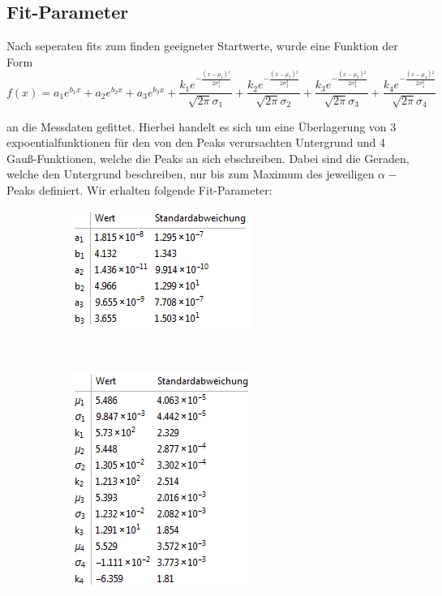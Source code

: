 \documentclass[bigchapter,colorback,accentcolor=tud4b,linedtoc,11pt]{tudreport}
\begin{document}
\subsection{Fit-Parameter}
Nach seperaten fits zum finden geeigneter Startwerte, wurde eine Funktion der
Form
$$f(x)=a_1 e^{b_1 x}+a_2 e^{b_2 x}+a_3 e^{b_3 x}+\frac{k_1 e^{-\frac{\left(x-\mu _1\right){}^2}{2 \sigma _1^2}}}{\sqrt{2 \pi } \sigma _1}+\frac{k_2 e^{-\frac{\left(x-\mu _2\right){}^2}{2 \sigma _2^2}}}{\sqrt{2 \pi } \sigma _2}+\frac{k_3 e^{-\frac{\left(x-\mu _3\right){}^2}{2 \sigma _3^2}}}{\sqrt{2 \pi } \sigma _3}+\frac{k_4 e^{-\frac{\left(x-\mu _4\right){}^2}{2 \sigma _4^2}}}{\sqrt{2 \pi } \sigma _4}$$

an die Messdaten gefittet. Hierbei handelt es sich um eine Überlagerung von 3
expoentialfunktionen für den von den Peaks verursachten Untergrund und 4
Gauß-Funktionen, welche die Peaks an sich ebschreiben. Dabei sind die Geraden, welche den Untergrund
beschreiben, nur bis zum Maximum des jeweiligen $\alpha-$ Peaks definiert.
Wir erhalten folgende Fit-Parameter:
\begin{figure}[H]
    \centering
    \begin{subfigure}[H]{0.44\textwidth}
        \includegraphics[scale=1]{img/alpha-exp-fits-parameter.png}
    \end{subfigure}%
    \qquad
    ~%
    \begin{subfigure}[H]{0.44\textwidth}
        \includegraphics[scale=1]{img/alpha-gauss-fits-parameter.png}
    \end{subfigure}
\end{figure}
\end{document}
